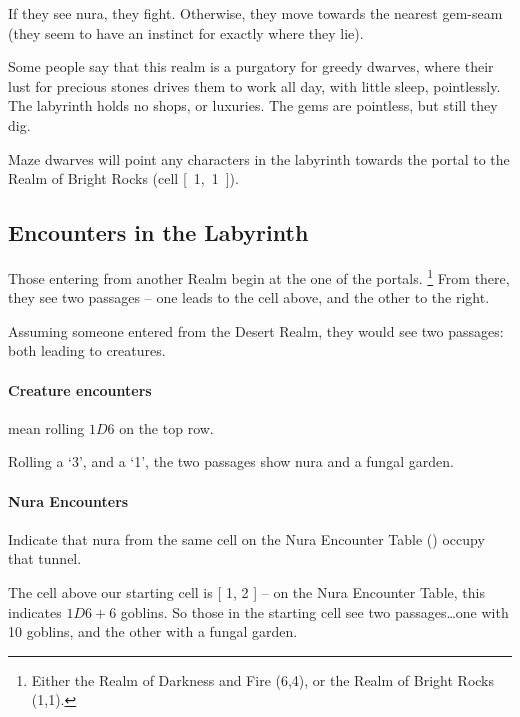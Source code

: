 \begin{multicols}{2}
If they see nura, they fight.
Otherwise, they move towards the nearest gem-seam (they seem to have an instinct for exactly where they lie).

Some people say that this realm is a purgatory for greedy dwarves, where their lust for precious stones drives them to work all day, with little sleep, pointlessly.
The labyrinth holds no shops, or luxuries.
The gems are pointless, but still they dig.

Maze dwarves will point any characters in the labyrinth towards the portal to the Realm of Bright Rocks (cell \mbox{[ 1, 1 ]}).

\subsection{Encounters in the Labyrinth}
\label{labyrinth}

Those entering from another Realm begin at the one of the portals.
\footnote{Either the Realm of Darkness and Fire (6,4), or the Realm of Bright Rocks (1,1).}
From there, they see two passages -- one leads to the cell above, and the other to the right.

\begin{exampletext}
  Assuming someone entered from the Desert Realm, they would see two passages: both leading to creatures.
\end{exampletext}

\paragraph{Creature encounters}
mean rolling $1D6$ on the top row.

\begin{exampletext}
  Rolling a `3', and a `1', the two passages show nura and a fungal garden.
\end{exampletext}

\paragraph{Nura Encounters}
Indicate that nura from the same cell on the Nura Encounter Table () occupy that tunnel.

\begin{exampletext}
  The cell above our starting cell is [ 1, 2 ] -- on the Nura Encounter Table, this indicates $1D6+6$ goblins.
  So those in the starting cell see two passages\ldots one with 10 goblins, and the other with a fungal garden.


\end{exampletext}
\end{multicols}

